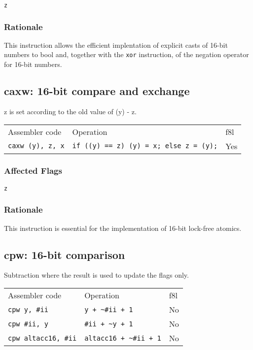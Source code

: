 \documentclass{book}
\begin{document}
\texttt{z}

\subsubsection*{Rationale}

This instruction allows the efficient implentation of explicit casts of 16-bit numbers to bool and, together with the \texttt{xor} instruction, of the negation operator for 16-bit numbers.


\subsection{caxw: 16-bit compare and exchange}

z is set according to the old value of (y) - z.

\begin{tabular}{l l l}
Assembler code           & Operation                                     & f8l \\
\texttt{caxw (y), z, x}  & \texttt{if ((y) == z) (y) = x; else z = (y);} & Yes \\

\end{tabular}

\subsubsection*{Affected Flags}

\texttt{z}

\subsubsection*{Rationale}

This instruction is essential for the implementation of 16-bit lock-free atomics.


\subsection{cpw: 16-bit comparison}

Subtraction where the result is used to update the flags only.

\begin{tabular}{l l l}
Assembler code              & Operation                        & f8l\\
\texttt{cpw y, \#ii}        & \texttt{y + \~{}\#ii + 1}        & No \\
\texttt{cpw \#ii, y}        & \texttt{\#ii + \~{}y + 1}        & No \\
\texttt{cpw altacc16, \#ii} & \texttt{altacc16 + \~{}\#ii + 1} & No \\
\end{tabular}
\end{document}
